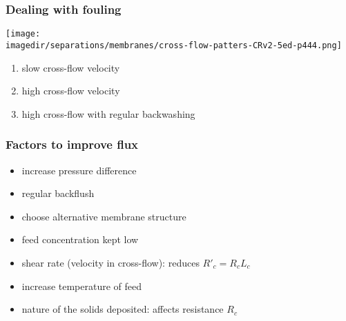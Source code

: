 \begin{frame}\frametitle{Dealing with fouling}
	\begin{center}
		\texttt{[image: \\imagedir/separations/membranes/cross-flow-patters-CRv2-5ed-p444.png]}
	\end{center}
	\vspace{-12pt}
	\renewcommand{\theenumi}{\alph{enumi}}
	\begin{enumerate}
		\item	slow cross-flow velocity
		\item	high cross-flow velocity
		\item	high cross-flow with regular backwashing
	\end{enumerate}
	\vspace{-6pt}
\end{frame}

\begin{frame}\frametitle{Factors to improve flux}
	\begin{itemize}
		\item	increase pressure difference
		\item	regular backflush
		\item	choose alternative membrane structure
		\item	feed concentration kept low
		\item	shear rate (velocity in cross-flow): reduces $R'_c = R_c L_c$
		\item	increase temperature of feed
		\item	nature of the solids deposited: affects resistance $R_c$
	\end{itemize}
\end{frame}

